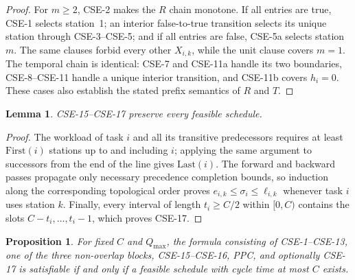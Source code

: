 \documentclass[]{interact}
\theoremstyle{plain}
\newtheorem{lemma}[theorem]{Lemma}
\newtheorem{proposition}[theorem]{Proposition}
\theoremstyle{definition}
\theoremstyle{remark}
\newcommand{\Qmax}{Q_{\max}}
\begin{document}
\begin{proof}
For $m\geq2$, CSE-2 makes the $R$ chain monotone. If all entries are true, CSE-1 selects station~1; an interior false-to-true transition selects its unique station through CSE-3--CSE-5; and if all entries are false, CSE-5a selects station~$m$. The same clauses forbid every other $X_{i,k}$, while the unit clause covers $m=1$. The temporal chain is identical: CSE-7 and CSE-11a handle its two boundaries, CSE-8--CSE-11 handle a unique interior transition, and CSE-11b covers $h_i=0$. These cases also establish the stated prefix semantics of $R$ and $T$.
\end{proof}

\begin{lemma}
CSE-15--CSE-17 preserve every feasible schedule.
\end{lemma}

\begin{proof}
The workload of task $i$ and all its transitive predecessors requires at least $\mathrm{First}(i)$ stations up to and including $i$; applying the same argument to successors from the end of the line gives $\mathrm{Last}(i)$. The forward and backward passes propagate only necessary precedence completion bounds, so induction along the corresponding topological order proves $e_{i,k}\leq\sigma_i\leq\ell_{i,k}$ whenever task $i$ uses station $k$. Finally, every interval of length $t_i\geq C/2$ within $[0,C)$ contains the slots $C-t_i,\ldots,t_i-1$, which proves CSE-17.
\end{proof}

\begin{proposition}
For fixed $C$ and $\Qmax$, the formula consisting of CSE-1--CSE-13, one of the three non-overlap blocks, CSE-15--CSE-16, PPC, and optionally CSE-17 is satisfiable if and only if a feasible schedule with cycle time at most $C$ exists.
\end{proposition}
\end{document}

